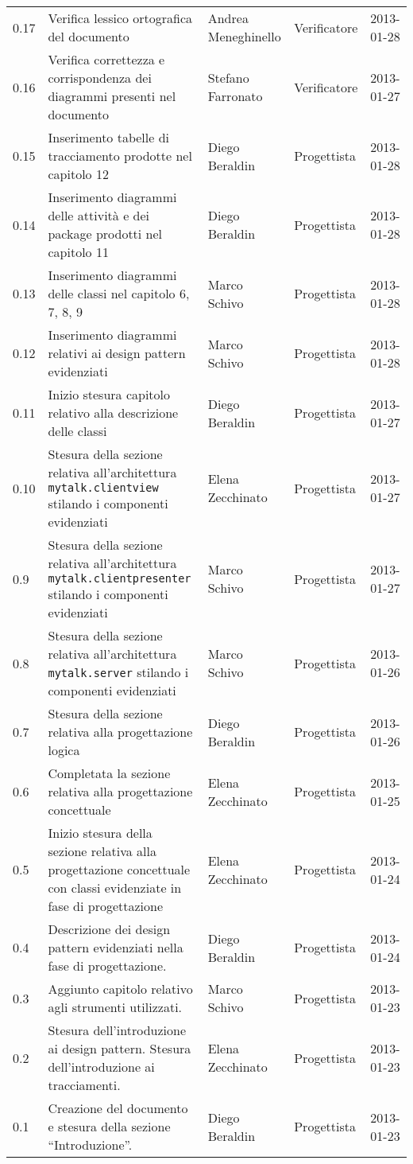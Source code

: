 \begin{center}
\begin{longtable}{lp{}lll}
0.17 & Verifica lessico ortografica del documento & Andrea Meneghinello & Verificatore & 2013-01-28\\
0.16 & Verifica correttezza e corrispondenza dei diagrammi presenti nel documento & Stefano Farronato & Verificatore & 2013-01-27\\
0.15 & Inserimento tabelle di tracciamento prodotte nel capitolo 12&Diego Beraldin & Progettista & 2013-01-28\\
0.14 & Inserimento diagrammi delle attività e dei package prodotti nel capitolo 11&Diego Beraldin & Progettista & 2013-01-28\\
0.13 & Inserimento diagrammi delle classi nel capitolo 6, 7, 8, 9&Marco Schivo & Progettista & 2013-01-28\\
0.12 & Inserimento diagrammi relativi ai design pattern evidenziati&Marco Schivo & Progettista & 2013-01-28\\
0.11 & Inizio stesura capitolo relativo alla descrizione delle classi&Diego Beraldin & Progettista & 2013-01-27\\
0.10 & Stesura della sezione relativa all'architettura \texttt{mytalk.clientview} stilando i componenti evidenziati&Elena Zecchinato & Progettista & 2013-01-27\\
0.9 & Stesura della sezione relativa all'architettura \texttt{mytalk.clientpresenter} stilando i componenti evidenziati&Marco Schivo & Progettista & 2013-01-27\\
0.8 & Stesura della sezione relativa all'architettura \texttt{mytalk.server} stilando i componenti evidenziati&Marco Schivo & Progettista & 2013-01-26\\
0.7 & Stesura della sezione relativa alla progettazione logica &Diego Beraldin  & Progettista & 2013-01-26\\
0.6 & Completata la sezione relativa alla progettazione concettuale &Elena Zecchinato & Progettista & 2013-01-25\\
0.5 & Inizio stesura della sezione relativa alla progettazione concettuale con classi evidenziate in fase di progettazione &Elena Zecchinato& Progettista & 2013-01-24\\
0.4 & Descrizione dei design pattern evidenziati nella fase di progettazione. &Diego Beraldin & Progettista & 2013-01-24\\
0.3 & Aggiunto capitolo relativo agli strumenti utilizzati.& Marco Schivo & Progettista & 2013-01-23\\
0.2 & Stesura dell'introduzione ai design pattern. Stesura dell'introduzione ai tracciamenti. &Elena Zecchinato & Progettista & 2013-01-23\\
0.1 & Creazione del documento e stesura della sezione ``Introduzione''. &Diego Beraldin & Progettista & 2013-01-23\\
\bottomrule
\end{longtable}
\end{center}
\clearpage

